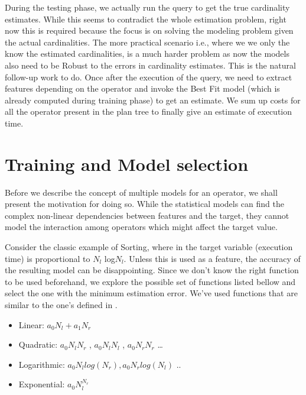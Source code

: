 \documentclass{article}
\begin{document}
\begin{multicols}{2}
\hfill
	
	During the testing phase, we actually run the query to get the true cardinality estimates. While this
	seems to contradict the whole estimation problem, right now this is required because the focus is on
	solving the modeling problem given the actual cardinalities. The more practical scenario i.e., where
	we we only the know the estimated cardinalities, is a much harder problem as now the models also need 
	to be Robust to the errors in cardinality estimates. This is the natural follow-up work to do. Once 
	after the execution of the query, we need to extract features depending on the operator and invoke 
	the Best Fit model (which is already computed during training phase) to get an estimate. We sum up 
	costs for all the operator present in the plan tree to finally give an estimate of execution time. 	


	\section{Training and Model selection}
	Before we describe the concept of multiple models for an operator, we shall present the motivation 
	for doing so. While the statistical models can find the complex non-linear dependencies between 			features and the target, they cannot model the interaction among operators which might
	affect the target value. 
     
	Consider the classic example of Sorting, where in the target variable (execution time) is 
	proportional to $N_{l}$ log$N_{l}$. Unless this is used as a feature, the accuracy of the resulting 
	model can be disappointing. Since we don't know the right function to be used beforehand, 
	we explore the possible set of functions listed bellow and select the one with the 
	minimum estimation error. We've used functions that are similar to the one's defined in 					\cite{robustIISc}.
	
	\begin{itemize}
	\item Linear: $a_{0} N_{l} + a_{1} N_{r}$ 
	\item Quadratic: $a_{0} N_{l}N_{r}$ , $a_{0} N_{l}N_{l}$ , $a_{0} N_{r}N_{r}$ \ldots
	\item Logarithmic: $a_{0} N_{l} log(N_{r}) , a_{0} N_{r} log(N_{l}) $ .. 
	\item Exponential: $a_{0} N_{l} ^ {N_{r}}$  	
	\end{itemize}	
	

\end{multicols}
\end{document}
